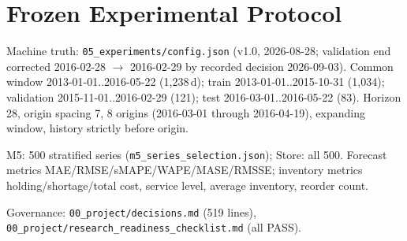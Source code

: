 \section{Frozen Experimental Protocol}
\label{app:protocol}
Machine truth: \texttt{05\_experiments/config.json} (v1.0, 2026-08-28;
validation end corrected 2016-02-28 $\rightarrow$ 2016-02-29 by recorded
decision 2026-09-03). Common window 2013-01-01..2016-05-22 (1,238\,d); train
2013-01-01..2015-10-31 (1,034); validation 2015-11-01..2016-02-29 (121);
test 2016-03-01..2016-05-22 (83). Horizon 28, origin spacing 7, 8 origins
(2016-03-01 through 2016-04-19), expanding window, history strictly before
origin. {\sloppy M5: 500 stratified series (\texttt{m5\_series\_selection.json});
Store: all 500. Forecast metrics MAE/RMSE/sMAPE/WAPE/MASE/RMSSE; inventory
metrics holding/shortage/total cost, service level, average inventory,
reorder count.\par} Governance: \texttt{00\_project/decisions.md} (519 lines),
\texttt{00\_project/research\_readiness\_checklist.md} (all PASS).
